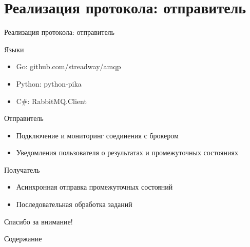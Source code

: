 \documentclass[xetex,mathserif,serif,10pt]{beamer}
\newenvironment{sframe}[2]{\section{#1}\begin{frame}[label=#2]{#1}}{\end{frame}}
\begin{document}
    \begin{sframe}{Реализация протокола: отправитель}{binddev}
        \begin{block}{Языки}
            \begin{itemize}
                \item Go: github.com/streadway/amqp
                \item Python: python-pika
                \item C\#: RabbitMQ.Client
            \end{itemize}
        \end{block}
        \begin{block}{Отправитель}
            \begin{itemize}
                \item Подключение и мониторинг соединения с брокером
                \item Уведомления пользователя о результатах и промежуточных
                    состояниях
            \end{itemize}
        \end{block}
        \begin{block}{Получатель}
            \begin{itemize}
                \item Асинхронная отправка промежуточных состояний
                \item Последовательная обработка заданий
            \end{itemize}
        \end{block}
    \end{sframe}

    \begin{frame}
        \Large\centering Спасибо за внимание!
    \end{frame}

    \begin{frame}{Содержание}
        \tableofcontents
    \end{frame}
\end{document}
